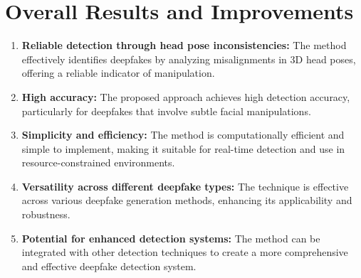 \documentclass{report}
\begin{document}
	\section{Overall Results and Improvements}
	\begin{enumerate}
		\item 
		\textbf{Reliable detection through head pose inconsistencies:} The method effectively identifies deepfakes by analyzing misalignments in 3D head poses, offering a reliable indicator of manipulation.
		
		\item 
		\textbf{High accuracy:} The proposed approach achieves high detection accuracy, particularly for deepfakes that involve subtle facial manipulations.
		
		\item 
		\textbf{Simplicity and efficiency:} The method is computationally efficient and simple to implement, making it suitable for real-time detection and use in resource-constrained environments.
		
		\item 
		\textbf{Versatility across different deepfake types:} The technique is effective across various deepfake generation methods, enhancing its applicability and robustness.
		
		\item 
		\textbf{Potential for enhanced detection systems:} The method can be integrated with other detection techniques to create a more comprehensive and effective deepfake detection system.
	\end{enumerate}
	
	
	
	
	
	
	
	
	
	\newpage
	
	
	
\end{document}
